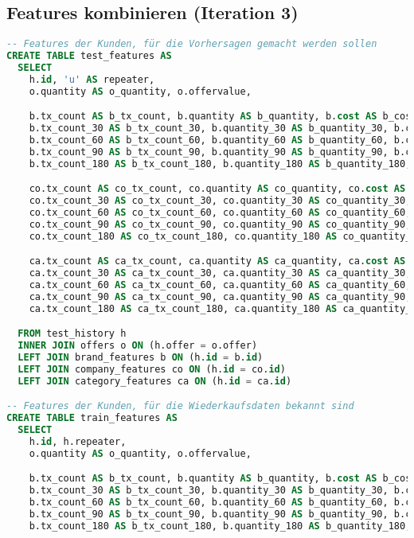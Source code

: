 \subsection{Features kombinieren (Iteration 3)}
\label{sql:features_combined_3}
\begin{lstlisting}[language=SQL]
-- Features der Kunden, für die Vorhersagen gemacht werden sollen
CREATE TABLE test_features AS
  SELECT 
    h.id, 'u' AS repeater,
    o.quantity AS o_quantity, o.offervalue,

    b.tx_count AS b_tx_count, b.quantity AS b_quantity, b.cost AS b_cost,
    b.tx_count_30 AS b_tx_count_30, b.quantity_30 AS b_quantity_30, b.cost_30 AS b_cost_30,
    b.tx_count_60 AS b_tx_count_60, b.quantity_60 AS b_quantity_60, b.cost_60 AS b_cost_60,
    b.tx_count_90 AS b_tx_count_90, b.quantity_90 AS b_quantity_90, b.cost_90 AS b_cost_90,
    b.tx_count_180 AS b_tx_count_180, b.quantity_180 AS b_quantity_180, b.cost_180 AS b_cost_180,

    co.tx_count AS co_tx_count, co.quantity AS co_quantity, co.cost AS co_cost,
    co.tx_count_30 AS co_tx_count_30, co.quantity_30 AS co_quantity_30, co.cost_30 AS co_cost_30,
    co.tx_count_60 AS co_tx_count_60, co.quantity_60 AS co_quantity_60, co.cost_60 AS co_cost_60,
    co.tx_count_90 AS co_tx_count_90, co.quantity_90 AS co_quantity_90, co.cost_90 AS co_cost_90,
    co.tx_count_180 AS co_tx_count_180, co.quantity_180 AS co_quantity_180, co.cost_180 AS co_cost_180,

    ca.tx_count AS ca_tx_count, ca.quantity AS ca_quantity, ca.cost AS ca_cost,
    ca.tx_count_30 AS ca_tx_count_30, ca.quantity_30 AS ca_quantity_30, ca.cost_30 AS ca_cost_30,
    ca.tx_count_60 AS ca_tx_count_60, ca.quantity_60 AS ca_quantity_60, ca.cost_60 AS ca_cost_60,
    ca.tx_count_90 AS ca_tx_count_90, ca.quantity_90 AS ca_quantity_90, ca.cost_90 AS ca_cost_90,
    ca.tx_count_180 AS ca_tx_count_180, ca.quantity_180 AS ca_quantity_180, ca.cost_180 AS ca_cost_180

  FROM test_history h
  INNER JOIN offers o ON (h.offer = o.offer)
  LEFT JOIN brand_features b ON (h.id = b.id)
  LEFT JOIN company_features co ON (h.id = co.id)
  LEFT JOIN category_features ca ON (h.id = ca.id)

-- Features der Kunden, für die Wiederkaufsdaten bekannt sind
CREATE TABLE train_features AS
  SELECT 
    h.id, h.repeater,
    o.quantity AS o_quantity, o.offervalue,

    b.tx_count AS b_tx_count, b.quantity AS b_quantity, b.cost AS b_cost,
    b.tx_count_30 AS b_tx_count_30, b.quantity_30 AS b_quantity_30, b.cost_30 AS b_cost_30,
    b.tx_count_60 AS b_tx_count_60, b.quantity_60 AS b_quantity_60, b.cost_60 AS b_cost_60,
    b.tx_count_90 AS b_tx_count_90, b.quantity_90 AS b_quantity_90, b.cost_90 AS b_cost_90,
    b.tx_count_180 AS b_tx_count_180, b.quantity_180 AS b_quantity_180, b.cost_180 AS b_cost_180,


\end{lstlisting}
